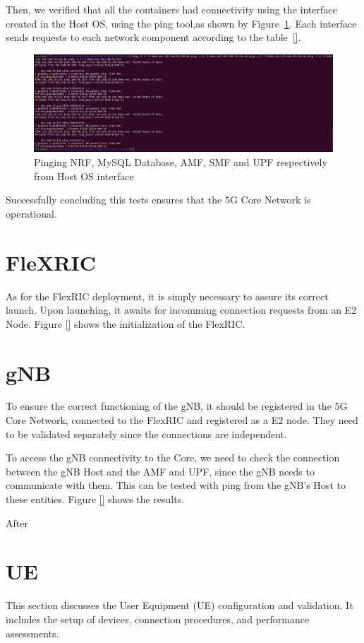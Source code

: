     Then, we verified that all the containers had connectivity using the interface created in the Host OS, using the ping tool,as shown by Figure~\ref{fig:ping_core}.
    Each interface sends requests to each network component according to the table~\ref{}.

\begin{figure}[H]
\centering
\includegraphics[width=0.5\linewidth]{figures/ping_core}
\caption[Pinging NRF, MySQL Database, AMF, SMF and UPF respectively from Host OS
interface]{Pinging NRF, MySQL Database, AMF, SMF and UPF respectively from Host OS
interface}
\label{fig:ping_core}
\end{figure}

Successfully concluding this tests ensures that the 5G Core Network is operational.



\section{FleXRIC}\label{sec:flexric}
As for the FlexRIC deployment, it is simply necessary to assure its correct launch. Upon launching, it awaits for incomming connection requests from an E2 Node.
Figure \ref{} shows the initialization of the FlexRIC.


\section{gNB}\label{sec:gnb}
To ensure the correct functioning of the gNB, it should be registered in the 5G Core Network, connected to the FlexRIC and registered as a E2 node.
They need to be validated separately since the connections are independent.

To access the gNB connectivity to the Core, we need to check the connection between the gNB Host and the AMF and UPF, since the gNB needs to communicate with them.
This can be tested with ping from the gNB's Host to these entities. Figure \ref{} shows the results.


After

\section{UE}\label{sec:ue}
This section discusses the User Equipment (UE) configuration and validation.
It includes the setup of devices, connection procedures, and performance assessments.

